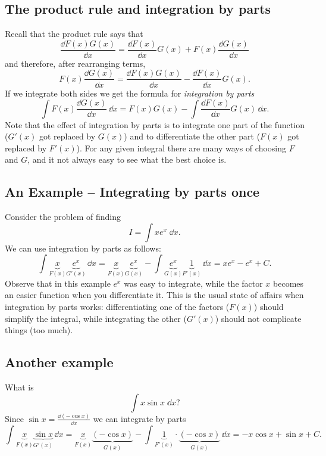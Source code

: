\subsection{The product rule and integration by parts} %
Recall that the product rule says that
\[
\frac{\dd F(x)G(x)}{\dd x}=\frac{\dd F(x)}{\dd x}G(x)+F(x)\frac{\dd G(x)}{\dd x}
\]
and therefore, after rearranging terms,
\[
F(x)\frac{\dd G(x)}{\dd x} = \frac{\dd F(x)G(x)}{\dd x} - \frac{\dd F(x)}{\dd
  x}G(x) .
\]
If we integrate both sides we get the formula for \emph{integration by parts}
\[
\int F(x)\frac{\dd G(x)}{\dd x}\,\dd x=F(x)G(x)-\int \frac{\dd F(x)}{\dd
  x}G(x)\,\dd x.
\]
Note that the effect of integration by parts is to integrate one part of the
function ($G'(x)$ got replaced by $G(x)$) and to differentiate the other part
($F(x)$ got replaced by $F'(x)$).  For any given integral there are many ways of
choosing $F$ and $G$, and it not always easy to see what the best choice is.


\subsection{An Example -- Integrating by parts once} %
Consider the problem of finding
\[
I = \int xe^x \; \dd x.
\]
We can use integration by parts as follows:
\[
\int \underbrace{x}_{F(x)}\underbrace{e^{x}}_{G'(x)}\,\dd x
=\underbrace{x}_{F(x)}\underbrace{e^{x}}_{G(x)} -\int
\underbrace{e^{x}}_{G(x)}\underbrace1_{F'(x)}\,\dd x = xe^x-e^x +C.
\]
Observe that in this example $e^x$ was easy to integrate, while the factor $x$
becomes an easier function when you differentiate it.  This is the usual state
of affairs when integration by parts works: differentiating one of the factors
($F(x)$) should simplify the integral, while integrating the other ($G'(x)$)
should not complicate things (too much).

\subsection{Another example} What is %
\[
\int x\sin x\;\dd x ?
\]
Since $\sin x = \frac{\dd (-\cos x)}{\dd x}$ we can integrate by parts
\[
\int \underbrace{x}_{F(x)}\underbrace{\sin x}_{G'(x)}\,\dd x
=\underbrace{x}_{F(x)} \underbrace{(-\cos x)}_{G(x)} - \int
\underbrace{1}_{F'(x)}\cdot\underbrace{(-\cos x)}_{G(x)}\,\dd x =-x\cos x+\sin
x+C.
\]

